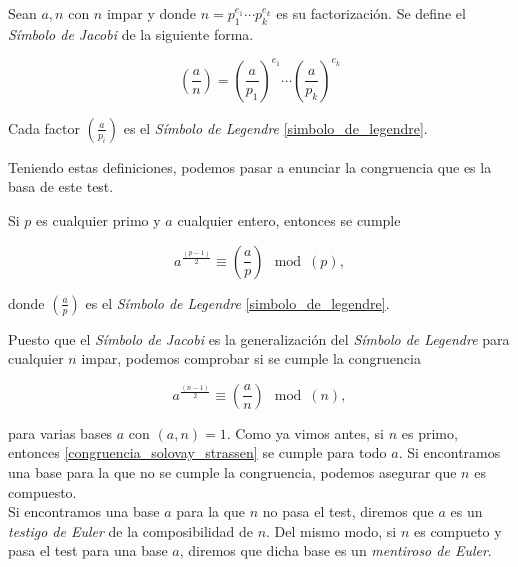 \begin{definicion}\label{simbolo_de_jacobi}
	Sean $a, n$ con $n$ impar y donde $n = p_1^{e_1}\dotsb p_k^{e_k}$ es su factorización. Se define el \textit{Símbolo de Jacobi} de la siguiente forma.
	
	\begin{equation}
	\left(\frac{a}{n}\right) = \left(\frac{a}{p_1}\right)^{e_1}\dotsb\left(\frac{a}{p_k}\right)^{e_k}
	\end{equation}
	
	Cada factor $\left(\frac{a}{p_i}\right)$ es el \textit{Símbolo de Legendre} \ref{simbolo_de_legendre}.
\end{definicion}

Teniendo estas definiciones, podemos pasar a enunciar la congruencia que es la basa de este test.

\begin{proposicion}
	Si $p$ es cualquier primo y $a$ cualquier entero, entonces se cumple
	
	\begin{equation}
	a^{\frac{(p-1)}{2}} \equiv \left(\frac{a}{p}\right) \mod(p),
	\end{equation}
	
	donde $\left(\frac{a}{p}\right)$ es el \textit{Símbolo de Legendre} \ref{simbolo_de_legendre}.
\end{proposicion}

Puesto que el \textit{Símbolo de Jacobi} es la generalización del \textit{Símbolo de Legendre} para cualquier $n$ impar, podemos comprobar si se cumple la congruencia

\begin{equation}\label{congruencia_solovay_strassen}
a^{\frac{(n-1)}{2}} \equiv \left(\frac{a}{n}\right) \mod(n),
\end{equation}

para varias bases $a$ con $(a, n) = 1$. Como ya vimos antes, si $n$ es primo, entonces \eqref{congruencia_solovay_strassen} se cumple para todo $a$. Si encontramos una base para la que no se cumple la congruencia, podemos asegurar que $n$ es compuesto.\\

Si encontramos una base $a$ para la que $n$ no pasa el test, diremos que $a$ es un \textit{testigo de Euler} de la composibilidad de $n$. Del mismo modo, si $n$ es compueto y pasa el test para una base $a$, diremos que dicha base es un \textit{mentiroso de Euler}.\\

